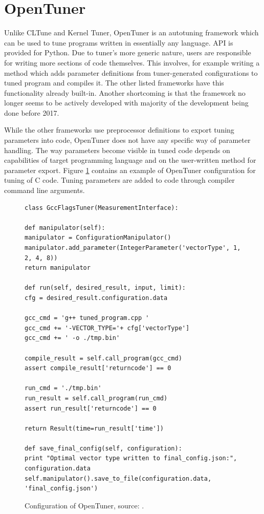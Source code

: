 \documentclass
[
    digital, %
    oneside, %
    table, %
    nolof, %
    nolot, %
    nocover %
]{fithesis3}
\begin{document}
\section{OpenTuner}
Unlike CLTune and Kernel Tuner, OpenTuner \cite{opentuner} is an autotuning framework which can be used to tune programs written in essentially any
language. API is provided for Python. Due to tuner's more generic nature, users are responsible for writing more sections of code themselves. This
involves, for example writing a method which adds parameter definitions from tuner-generated configurations to tuned program and compiles it. The
other listed frameworks have this functionality already built-in. Another shortcoming is that the framework no longer seems to be actively developed
with majority of the development being done before 2017.

While the other frameworks use preprocessor definitions to export tuning parameters into code, OpenTuner does not have any specific way of parameter
handling. The way parameters become visible in tuned code depends on capabilities of target programming language and on the user-written method for
parameter export. Figure \ref{opentuner-example} contains an example of OpenTuner configuration for tuning of C code. Tuning parameters are added
to code through compiler command line arguments.

\begin{figure}
\begin{lstlisting}
class GccFlagsTuner(MeasurementInterface):

def manipulator(self):
manipulator = ConfigurationManipulator()
manipulator.add_parameter(IntegerParameter('vectorType', 1, 2, 4, 8))
return manipulator

def run(self, desired_result, input, limit):
cfg = desired_result.configuration.data

gcc_cmd = 'g++ tuned_program.cpp '
gcc_cmd += '-VECTOR_TYPE='+ cfg['vectorType']
gcc_cmd += ' -o ./tmp.bin'

compile_result = self.call_program(gcc_cmd)
assert compile_result['returncode'] == 0

run_cmd = './tmp.bin'
run_result = self.call_program(run_cmd)
assert run_result['returncode'] == 0

return Result(time=run_result['time'])

def save_final_config(self, configuration):
print "Optimal vector type written to final_config.json:", configuration.data
self.manipulator().save_to_file(configuration.data, 'final_config.json')
\end{lstlisting}
\caption{Configuration of OpenTuner, source: \cite{opentuner}.}
\label{opentuner-example}
\end{figure}
\end{document}
